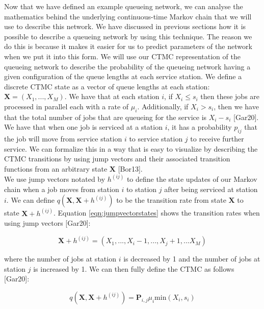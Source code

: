 \documentclass[a4paper,11pt,titlepage]{article}
\begin{document}
Now that we have defined an example queueing network, we can analyse the mathematics behind the underlying continuous-time Markov chain that we will use to describe this network. We have discussed in previous sections how it is possible to describe a queueing network by using this technique. The reason we do this is because it makes it easier for us to predict parameters of the network when we put it into this form. We will use our CTMC representation of the queueing network to describe the probability of the queueing network having a given configuration of the queue lengths at each service station. We define a discrete CTMC state as a vector of queue lengths at each station: $\mathbf{X} = (X_1,...,X_M)$. We have that at each station $i$, if $X_i \leq s_i$ then these jobs are processed in parallel each with a rate of $\mu_i$. Additionally, if $X_i > s_i$, then we have that the total number of jobs that are queueing for the service is $X_i - s_i$ [Gar20]. We have that when one job is serviced at a station $i$, it has a probability $p_{ij}$ that the job will move from service station $i$ to service station $j$ to receive further service. We can formalize this in a way that is easy to visualize by describing the CTMC transitions by using jump vectors and their associated transition functions from an arbitrary state $\mathbf{X}$ [Bor13]. \\

We use jump vectors notated by $h^{(ij)}$ to define the state updates of our Markov chain when a job moves from station $i$ to station $j$ after being serviced at station $i$. We can define $q(\mathbf{X}, \mathbf{X}+h^{(ij)})$ to be the transition rate from state $\mathbf{X}$ to state $\mathbf{X} + h^{(ij)}$. Equation \ref{eqn:jumpvectorstates} shows the transition rates when using jump vectors [Gar20]: 

\begin{equation}
    \mathbf{X}+h^{(ij)} = \left(X_1,...,X_i-1,...,X_j+1,...X_M \right)
    \label{eqn:jumpvectorstates}
\end{equation}

where the number of jobs at station $i$ is decreased by 1 and the number of jobs at station $j$ is increased by 1. We can then fully define the CTMC as follows [Gar20]: 

\begin{equation}
    q(\mathbf{X},\mathbf{X}+h^{(ij)}) = \mathbf{P}_{i,j} \mu_i \text{min}(X_i,s_i)
    \label{eqn:CTMC_NN}
\end{equation}
\end{document}
